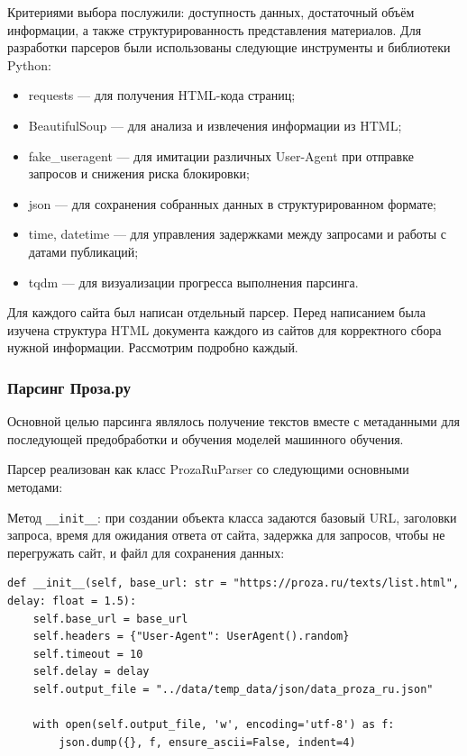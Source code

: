 \documentclass[coursework]{SCWorks}
\begin{document}
    Критериями выбора послужили: доступность данных, достаточный объём информации, а также структурированность представления материалов.
    Для разработки парсеров были использованы следующие инструменты и библиотеки Python:
    \begin{itemize}
        \item requests — для получения HTML-кода страниц;
        \item BeautifulSoup — для анализа и извлечения информации из HTML;
        \item fake\_useragent — для имитации различных User-Agent при отправке запросов и снижения риска блокировки;
        \item json — для сохранения собранных данных в структурированном формате;
        \item time, datetime — для управления задержками между запросами и работы с датами публикаций;
        \item tqdm — для визуализации прогресса выполнения парсинга.
    \end{itemize}
    Для каждого сайта был написан отдельный парсер.
    Перед написанием была изучена структура HTML документа каждого из сайтов для корректного сбора нужной информации.
    Рассмотрим подробно каждый.

    \subsubsection{Парсинг Проза.ру}
    Основной целью парсинга являлось получение текстов вместе с метаданными для
    последующей предобработки и обучения моделей машинного обучения.

    Парсер реализован как класс ProzaRuParser со следующими основными методами:

    Метод \texttt{\_\_init\_\_}: при создании объекта класса задаются базовый URL, заголовки запроса, время для ожидания ответа от сайта,
    задержка для запросов, чтобы не перегружать сайт, и файл для сохранения данных:
    \begin{verbatim}
def __init__(self, base_url: str = "https://proza.ru/texts/list.html", delay: float = 1.5):
    self.base_url = base_url
    self.headers = {"User-Agent": UserAgent().random}
    self.timeout = 10
    self.delay = delay
    self.output_file = "../data/temp_data/json/data_proza_ru.json"

    with open(self.output_file, 'w', encoding='utf-8') as f:
        json.dump({}, f, ensure_ascii=False, indent=4)
    \end{verbatim}
\end{document}
